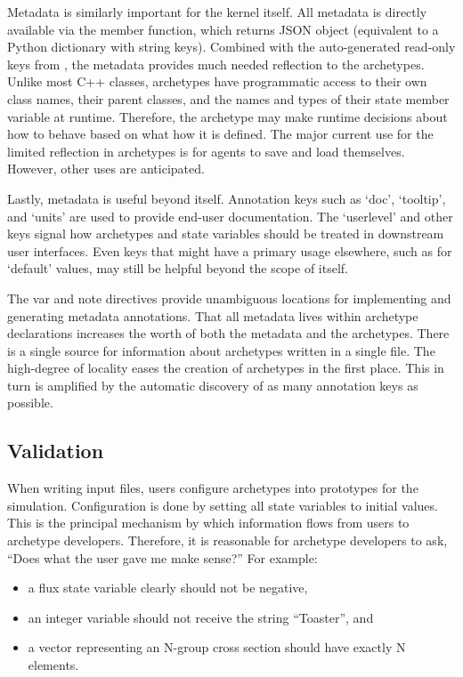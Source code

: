 Metadata is similarly important for the \cyclus kernel itself. All metadata is 
directly available via the  member function, which returns 
\gls{JSON} 
object (equivalent to a Python dictionary with string keys). Combined with the 
auto-generated read-only keys from \cycpp, the metadata provides much needed 
reflection to the archetypes.  Unlike most C++ classes, archetypes have 
programmatic access to their own class names, their parent classes, and the names and 
types of their state member variable at runtime. Therefore, the archetype may 
make runtime decisions about how to behave based on what how it is defined.
The major current use for the limited reflection in archetypes is for agents to 
save and load themselves. However, other uses are anticipated.

Lastly, metadata is useful beyond \cyclus itself. Annotation keys such as `doc',
`tooltip', and `units' are used to provide end-user documentation. The `userlevel'
and other keys signal how archetypes and state variables should be treated in 
downstream user interfaces.  Even keys that might have a primary usage elsewhere, 
such as for `default' values, may still be helpful beyond the scope of \cyclus 
itself.  

The var and note directives provide unambiguous locations for implementing and 
generating metadata annotations. That all metadata lives within archetype 
declarations increases the worth of both the metadata and the archetypes.
There is a single source for information about archetypes written in a single file.
The high-degree of locality eases the creation of archetypes in the first place.
This in turn is amplified by the automatic discovery of as many annotation 
keys as possible.

\subsection{Validation}

When writing \cyclus input files, users configure archetypes into prototypes 
for the simulation.  Configuration is done by setting all state variables to 
  initial values. This is the principal mechanism by which information flows 
  from users to archetype developers. Therefore, it is reasonable for archetype 
  developers to ask, ``Does what the user gave me make sense?'' For example: 

\begin{itemize} 
    \item a flux state variable clearly should not be negative, 
    \item an integer variable should not receive the string ``Toaster'', and
    \item a vector representing an N-group cross section should have exactly N 
          elements.
\end{itemize} 

